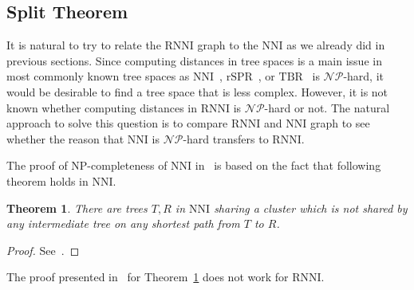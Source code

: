 \documentclass[11pt, a4paper]{article}
\newcommand{\np}{\mathcal{NP}}
\newcommand{\nni}{\mathrm{NNI}}
\newcommand{\rnni}{\mathrm{RNNI}}
\newcommand{\tbr}{\mathrm{TBR}}
\newcommand{\rspr}{\mathrm{rSPR}}
\newtheorem{theorem}[definition]{Theorem}
\begin{document}
\subsection{Split Theorem}

It is natural to try to relate the $\rnni$ graph to the $\nni$ as we already did in previous sections.
Since computing distances in tree spaces is a main issue in most commonly known tree spaces as $\nni$~\cite{jiang2000}, $\rspr$~\cite{Bordewich2005}, or $\tbr$~\cite{allen2001subtree} is $\np$-hard, it would be desirable to find a tree space that is less complex.
However, it is not known whether computing distances in $\rnni$ is $\np$-hard or not.
The natural approach to solve this question is to compare $\rnni$ and $\nni$ graph to see whether the reason that $\nni$ is $\np$-hard transfers to $\rnni$.

The proof of NP-completeness of $\nni$ in~\cite{jiang2000} is based on the fact that following theorem holds in $\nni$.

\begin{theorem}
	There are trees $T,R$ in $\nni$ sharing a cluster which is not shared by any intermediate tree on any shortest path from $T$ to $R$.
	\label{thm:split_nni}
\end{theorem}

\begin{proof}
	See~\cite{Li1996}.
\end{proof}

The proof presented in~\cite{Li1996} for Theorem~\ref{thm:split_nni} does not work for $\rnni$.
\end{document}
